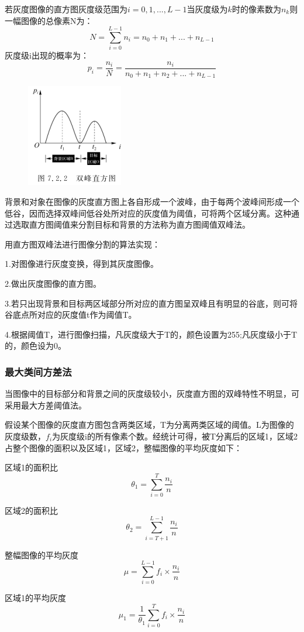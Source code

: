 \documentclass[11pt]{article}
\begin{document}
若灰度图像的直方图灰度级范围为$i=0,1,...,L-1$当灰度级为$k$时的像素数为$n_k$则一幅图像的总像素N为：
$$ N = \sum_{i=0}^{L-1}n_i = n_0 + n_1 + ... + n_{L-1}$$
灰度级i出现的概率为：
$$p_i = \frac{n_i}{N} = \frac{n_i}{n_0 + n_1 + n_2 + ... + n_{L-1}}$$
\begin{figure}
	\centering
	\includegraphics[width=0.23\textheight]{50}
\end{figure}

背景和对象在图像的灰度直方图上各自形成一个波峰，由于每两个波峰间形成一个低谷，因而选择双峰间低谷处所对应的灰度值为阈值，可将两个区域分离。这种通过选取直方图阈值来分割目标和背景的方法称为直方图阈值双峰法。

用直方图双峰法进行图像分割的算法实现：

1.对图像进行灰度变换，得到其灰度图像。

2.做出灰度图像的直方图。

3.若只出现背景和目标两区域部分所对应的直方图呈双峰且有明显的谷底，则可将谷底点所对应的灰度值t作为阈值T。

4.根据阈值T，进行图像扫描，凡灰度级大于T的，颜色设置为255;凡灰度级小于T的，颜色设为0。

\subsubsection{最大类间方差法}
当图像中的目标部分和背景之间的灰度级较小，灰度直方图的双峰特性不明显，可采用最大方差阈值法。

假设某个图像的灰度直方图包含两类区域，T为分离两类区域的阈值。L为图像的灰度级数，$f_i$为灰度级i的所有像素个数。经统计可得，被T分离后的区域1，区域2占整个图像的面积以及区域1，区域2，整幅图像的平均灰度如下：

区域1的面积比$$\theta_1 = \sum_{i=0}^{T}\frac{n_i}{n}$$

区域2的面积比$$\theta_2 = \sum_{i=T+1}^{L-1}\frac{n_i}{n}$$

整幅图像的平均灰度$$\mu = \sum_{i=0}^{L-1}f_i\times \frac{n_i}{n}$$

区域1的平均灰度$$\mu_1 = \frac{1}{\theta_1}\sum_{i=0}^{T}f_i\times \frac{n_i}{n}$$
\end{document}
